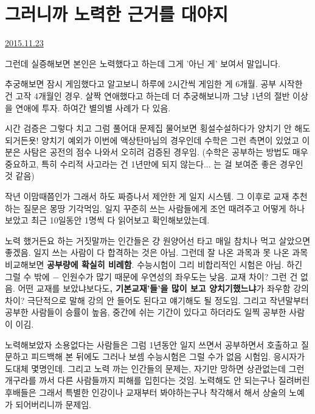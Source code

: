 \section{그러니까 노력한 근거를 대야지}
\href{https://www.kockoc.com/Apoc/505846}{2015.11.23}

\vspace{5mm}

그런데 실증해보면 본인은 노력했다고 하는데 그게 '아닌 게' 보여서 말입니다.
\vspace{5mm}

추궁해보면 잠시 게임했다고 알고보니 하루에 2시간씩 게임한 게 6개월. 공부 시작한 건 고작 4개월인 경우.
살짝 연애했다고 하는데 더 추궁해보니까 그냥 1년의 절반 이상을 연애에 투자.
하여간 별의별 사례가 다 있음.
\vspace{5mm}

시간 검증은 그렇다 치고 그럼 풀어대 문제집 물어보면 횡설수설하다가 양치기 안 해도 되거든욧!
양치기 예외가 이번에 액상탄마님의 경우인데 수학은 그런 측면이 있었고 이 분은 사탐은 공전의 점수 나와서 오히려 검증된 경우임.
(수학은 공부하는 방법도 매우 중요하고, 특히 수리적 사고라는 건 1년만에 되지 않는다... 는 걸 보여준 좋은 경우인 것 같음)
\vspace{5mm}

작년 이맘때쯤인가 그래서 하도 짜증나서 제안한 게 일지 시스템.
그 이후로 교재 추천하는 질문은 몽땅 기각먹임.
일지 꾸준히 쓰는 사람들에게 조언 때려주고 어떻게 하나보았고
최근 10일동안 1명씩 다 읽어보고 확인해보았는데.
\vspace{5mm}

노력 했거든요 하는 거짓말까는 인간들은 걍 원양어선 타고 매일 참치나 먹고 살았으면 좋겠음.
일지 쓰는 사람이 다 합격하는 것은 아님.
그런데 잘 나온 과목과 못 나온 과목 비교해보면 \textbf{공부량에 확실히 비례함}.
수능시험이 그리 비합리적인 시험은 아님. 하긴 그럴 수 밖에 $-$ 인원수가 많기 때문에 우연성의 좌우도는 낮음.
교재 차이? 그런 건 없음. 어떤 교재를 보았냐보다도\textbf{, 기본교재'들'을 많이 보고 양치기했느냐}가 좌우함
강의 차이? 극단적으로 말해 강의 안 들어도 된다고 얘기해도 될 정도임.
그리고 작년말부터 공부한 사람들이 승률이 높음, 중간에 쉬는 기간이 있다고 하더라도 일찍 공부한 사람이 이김.
\vspace{5mm}

노력해보았자 소용없다는 사람들은 그럼 1년동안
일지 쓰면서 공부하면서 호출하고 질문하고 피드백해 본 뒤에도 그러나 보셈
수능시험은 그럴 수가 없음 시험임. 응시자가 도대체 몇명인데.
그리고 노력 까는 인간들의 문제는, 자기만 망하면 상관없는데
그런 개구라를 까서 다른 사람들까지 피해를 입힌다는 것임.
노력해도 안 되는구나 질려버린 후배들은
그래서 특별한 인강이나 교재부터 봐야하는구나 착각해서 해서 상술의 노예가 되어버리니까 문제임.
\vspace{5mm}

